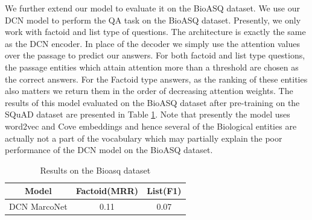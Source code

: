 We further extend our model to evaluate it on the BioASQ dataset. We use our DCN model to perform the QA task on the BioASQ dataset. Presently, we only work with factoid and list type of questions. The architecture is exactly the same as the DCN encoder. In place of the decoder we simply use the attention values over the passage to predict our answers. For both factoid and list type questions, the passage entities which attain attention more than a threshold are chosen as the correct answers. For the Factoid type answers, as the ranking of these entities also matters we return them in the order of decreasing attention weights. The results of this model evaluated on the BioASQ dataset after pre-training on the SQuAD dataset are presented in Table \ref{tab:bioasq_res}. Note that presently the model uses word2vec and Cove embeddings and hence several of the Biological entities are actually not a part of the vocabulary which may partially explain the poor performance of the DCN model on the BioASQ dataset.

\begin{table}
\begin{tabular}{|c|c|c|}
    \hline \hline
    Model & Factoid(MRR) & List(F1)\\
    \hline
    DCN MarcoNet& 0.11&0.07\\
    \hline \hline
\end{tabular}
    \caption{Results on the Bioasq dataset}
    \label{tab:bioasq_res}
\end{table}
